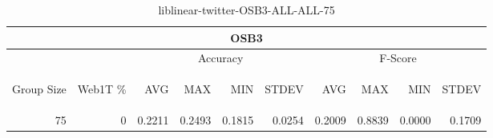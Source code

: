 \begin{center}
\begin{table}[htbp] 
 \begin{center}
\begin{tabular}{ | r | r | r | r | r | r | r | r | r | r |}
\hline
\multicolumn{10}{|c|}{OSB3}\\
\hline
 & & \multicolumn{4}{|c|}{Accuracy} & \multicolumn{4}{|c|}{F-Score}\\ \cline{3-10}
\begin{sideways}Group Size\end{sideways} & \begin{sideways}Web1T \%\end{sideways} & \begin{sideways}AVG\end{sideways} & \begin{sideways}MAX\end{sideways} & \begin{sideways}MIN\end{sideways} & \begin{sideways}STDEV\end{sideways} & \begin{sideways}AVG\end{sideways} & \begin{sideways}MAX\end{sideways} & \begin{sideways}MIN\end{sideways} & \begin{sideways}STDEV\end{sideways}\\
\hline
\multirow{0}{*}{75}
 & 0 & 0.2211 & 0.2493 & 0.1815 & 0.0254 & 0.2009 & 0.8839 & 0.0000 & 0.1709\\ \cline{2-10}
\hline
\end{tabular}
\caption{liblinear-twitter-OSB3-ALL-ALL-75}
\label{table:liblinear-twitter-OSB3-ALL-ALL-75}
\end{center}
 \end{table}
\end{center}

